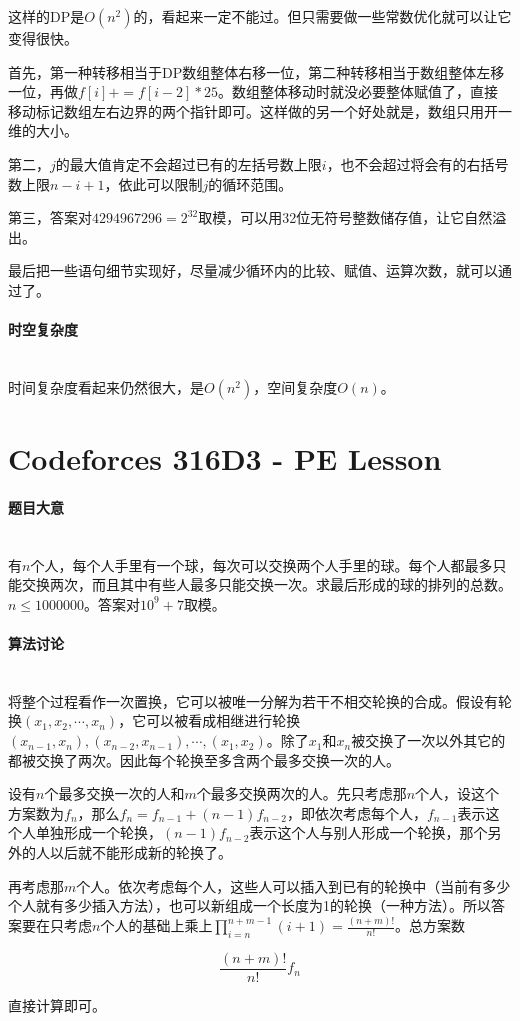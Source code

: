 \documentclass[UTF8]{ctexart}
\newcommand{\myparagraph}[1]{\paragraph{#1}\mbox{}\\}
\theoremstyle{nonumberplain}
\begin{document}
			这样的DP是$O(n^2)$的，看起来一定不能过。但只需要做一些常数优化就可以让它变得很快。
			
			首先，第一种转移相当于DP数组整体右移一位，第二种转移相当于数组整体左移一位，再做$f[i]+=f[i-2]*25$。数组整体移动时就没必要整体赋值了，直接移动标记数组左右边界的两个指针即可。这样做的另一个好处就是，数组只用开一维的大小。
			
			第二，$j$的最大值肯定不会超过已有的左括号数上限$i$，也不会超过将会有的右括号数上限$n-i+1$，依此可以限制$j$的循环范围。
			
			第三，答案对$4294967296=2^{32}$取模，可以用32位无符号整数储存值，让它自然溢出。
			
			最后把一些语句细节实现好，尽量减少循环内的比较、赋值、运算次数，就可以通过了。
		
		\myparagraph{时空复杂度}
		
			时间复杂度看起来仍然很大，是$O(n^2)$，空间复杂度$O(n)$。
	
	\section{Codeforces 316D3 - PE Lesson}
	
		\myparagraph{题目大意}
		
			有$n$个人，每个人手里有一个球，每次可以交换两个人手里的球。每个人都最多只能交换两次，而且其中有些人最多只能交换一次。求最后形成的球的排列的总数。$n \leq 1000000$。答案对$10^9+7$取模。
		
		\myparagraph{算法讨论}
		
			将整个过程看作一次置换，它可以被唯一分解为若干不相交轮换的合成。假设有轮换$(x_1,x_2,\cdots,x_n)$，它可以被看成相继进行轮换$(x_{n-1},x_n),(x_{n-2},x_{n-1}),\cdots,(x_1,x_2)$。除了$x_1$和$x_n$被交换了一次以外其它的都被交换了两次。因此每个轮换至多含两个最多交换一次的人。
			
			设有$n$个最多交换一次的人和$m$个最多交换两次的人。先只考虑那$n$个人，设这个方案数为$f_n$，那么$f_n=f_{n-1}+(n-1)f_{n-2}$，即依次考虑每个人，$f_{n-1}$表示这个人单独形成一个轮换，$(n-1)f_{n-2}$表示这个人与别人形成一个轮换，那个另外的人以后就不能形成新的轮换了。
			
			再考虑那$m$个人。依次考虑每个人，这些人可以插入到已有的轮换中（当前有多少个人就有多少插入方法），也可以新组成一个长度为1的轮换（一种方法）。所以答案要在只考虑$n$个人的基础上乘上$\prod_{i=n}^{n+m-1}(i+1)=\frac{(n+m)!}{n!}$。总方案数
			
			$$\frac{(n+m)!}{n!}f_n$$
			
			直接计算即可。
		
\end{document}
